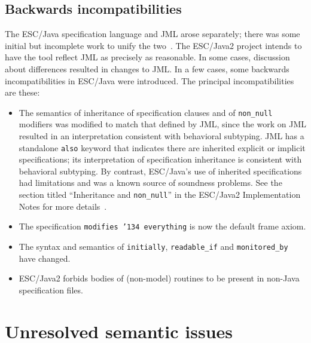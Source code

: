\documentclass{llncs}
\begin{document}
\subsection{Backwards incompatibilities}
The ESC/Java specification language and JML arose separately; there
was some initial but incomplete work to unify the
two~\cite{Leavens-etal03}.  The ESC/Java2 project intends to have the
tool reflect JML as precisely as reasonable.  In some cases,
discussion about differences resulted in changes to JML.  In a few
cases, some backwards incompatibilities in ESC/Java were introduced.
The principal incompatibilities are these:
\setlength{\partopsep}{0in}\setlength{\parskip}{0in}\setlength{\itemsep}{0in}\setlength{\topsep}{0in}
\begin{itemize}
\setlength{\partopsep}{0in}\setlength{\parskip}{0in}\setlength{\itemsep}{0in}\setlength{\topsep}{0in}
\item The semantics of inheritance of specification clauses and of
  \texttt{non\_null} modifiers was modified to match that defined by
  JML, since the work on JML resulted in an interpretation consistent
  with behavioral subtyping.  JML has a standalone \texttt{also} keyword
that indicates there are inherited explicit or implicit specifications; its
interpretation of specification inheritance is consistent with behavioral
subtyping.  By contrast, ESC/Java's use of inherited specifications had
limitations and was a known source of soundness problems. \cite{Leino-Nelson-Saxe00}
See
  the section titled ``Inheritance and \texttt{non\_null}'' in the
  ESC/Java2 Implementation Notes for more
  details~\cite{Cok04-Impl-Notes}.
\item The specification \texttt{modifies \char'134 everything} is now
  the default frame axiom.
\item The syntax and semantics of \texttt{initially},
  \texttt{readable\_if} and \texttt{monitored\_by} have changed.
\item ESC/Java2 forbids bodies of (non-model) routines to be present
  in non-Java specification files.
\end{itemize}

\section{Unresolved semantic issues}
\end{document}
